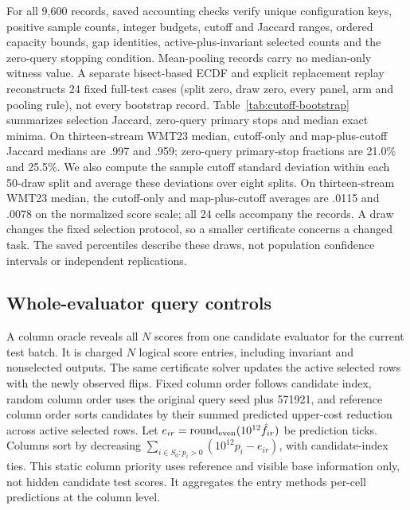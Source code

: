 For all 9,600 records, saved accounting checks verify unique configuration keys, positive sample counts, integer budgets, cutoff and Jaccard ranges, ordered capacity bounds, gap identities, active-plus-invariant selected counts and the zero-query stopping condition. Mean-pooling records carry no median-only witness value. A separate bisect-based ECDF and explicit replacement replay reconstructs 24 fixed full-test cases (split zero, draw zero, every panel, arm and pooling rule), not every bootstrap record. Table~\ref{tab:cutoff-bootstrap} summarizes selection Jaccard, zero-query primary stops and median exact minima. On thirteen-stream WMT23 median, cutoff-only and map-plus-cutoff Jaccard medians are .997 and .959; zero-query primary-stop fractions are 21.0\% and 25.5\%. We also compute the sample cutoff standard deviation within each 50-draw split and average these deviations over eight splits. On thirteen-stream WMT23 median, the cutoff-only and map-plus-cutoff averages are .0115 and .0078 on the normalized score scale; all 24 cells accompany the records. A draw changes the fixed selection protocol, so a smaller certificate concerns a changed task. The saved percentiles describe these draws, not population confidence intervals or independent replications.


\subsection{Whole-evaluator query controls}
A column oracle reveals all $N$ scores from one candidate evaluator for the current test batch. It is charged $N$ logical score entries, including invariant and nonselected outputs. The same certificate solver updates the active selected rows with the newly observed flips. Fixed column order follows candidate index, random column order uses the original query seed plus 571921, and reference column order sorts candidates by their summed predicted upper-cost reduction across active selected rows. Let $e_{ir}=\operatorname{round}_{\rm even}(10^{12}\hat f_{ir})$ be prediction ticks. Columns sort by decreasing $\sum_{i\in S_0:p_i>0}(10^{12}p_i-e_{ir})$, with candidate-index ties. This static column priority uses reference and visible base information only, not hidden candidate test scores. It aggregates the entry method\textquotesingle s per-cell predictions at the column level.


